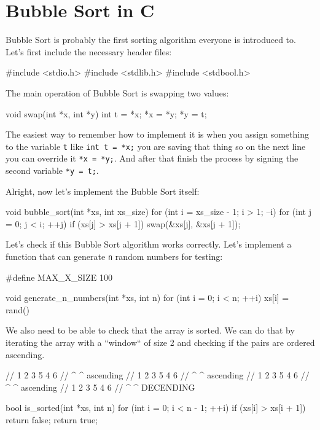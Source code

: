 \documentclass{article}
\newenvironment{code}{\footnotesize\verbatim}{\endverbatim\normalsize}
\begin{document}
\section{Bubble Sort in C}

Bubble Sort is probably the first sorting algorithm everyone is introduced to. Let's first include the necessary header files:

\begin{code}
#include <stdio.h>
#include <stdlib.h>
#include <stdbool.h>
\end{code}

The main operation of Bubble Sort is swapping two values:

\begin{code}
void swap(int *x, int *y)
{
  int t = *x;
  *x = *y;
  *y = t;
}
\end{code}

The easiest way to remember how to implement it is when you assign something to the variable \verb|t| like \verb|int t = *x;| you are saving that thing so on the next line you can override it \verb|*x = *y;|. And after that finish the process by signing the second variable \verb|*y = t;|.

Alright, now let's implement the Bubble Sort itself:

\begin{code}
void bubble_sort(int *xs, int xs_size)
{
  for (int i = xs_size - 1; i > 1; --i) {
    for (int j = 0; j < i; ++j) {
      if (xs[j] > xs[j + 1]) {
        swap(&xs[j], &xs[j + 1]);
      }
    }
  }
}
\end{code}

Let's check if this Bubble Sort algorithm works correctly. Let's implement a function that can generate \verb|n| random numbers for testing:

\begin{code}
#define MAX_X_SIZE 100

void generate_n_numbers(int *xs, int n)
{
  for (int i = 0; i < n; ++i) {
    xs[i] = rand() %
  }
}
\end{code}

We also need to be able to check that the array is sorted. We can do that by iterating the array with a ``window`` of size 2 and checking if the pairs are ordered ascending.

\pagebreak

\begin{code}
// 1 2 3 5 4 6
// ^ ^ ascending
// 1 2 3 5 4 6
//   ^ ^ ascending
// 1 2 3 5 4 6
//     ^ ^ ascending
// 1 2 3 5 4 6
//       ^ ^ DECENDING
\end{code}

\begin{code}
bool is_sorted(int *xs, int n)
{
  for (int i = 0; i < n - 1; ++i) {
    if (xs[i] > xs[i + 1]) {
      return false;
    }
  }
  return true;
}
\end{code}
\end{document}
